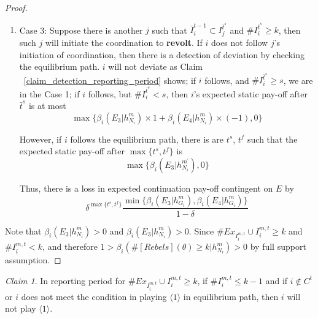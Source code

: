 \documentclass[12pt,letterpaper]{article}
\theoremstyle{definition}
\theoremstyle{remark}
\theoremstyle{claim}
\newtheorem{claim}{Claim}
\begin{document}
\begin{proof}
\begin{enumerate}
\item Case 3: Suppose there is another $j$ such that $\bar{I}^{t-1}_i\subset {I}^{\bar{t}^{s}}_j$ and $\# I^{\bar{t}^s}_i\geq k$, then such $j$ will initiate  the coordination to \textbf{revolt}. If $i$ does not follow $j$'s initiation of coordination, then there is a detection of deviation by checking the equilibrium path. $i$ will not deviate as Claim ~\ref{claim_detection_reporting_period} shows; if $i$ follows, and $\#I^{\bar{t}^s}_i\geq s$, we are in the Case 1; if $i$ follows, but $\#I^{\bar{t}^s}_i< s$, then $i$'s expected static pay-off after $\bar{t}^{s}$ is at most
\[
{\max\{\beta_{i}(E_3|h^{m}_{N_i})\times 1+\beta_{i}(E_4|h^{m}_{N_i})\times (-1), 0\}}
\]

However, if $i$ follows the equilibrium path, there is are $t^s$, $t^f$ such that the expected static pay-off after $\max\{t^s,t^f\}$ is
\[\max\{\beta_{i}(E_3|h^{m^{'}}_{N_i}),0\}\]

Thus, there is a loss in expected continuation pay-off contingent on $E$ by
\[\delta^{\max\{t^s,t^f\}}\frac{\min\{\beta_{i}(E_3|h^{m}_{G_i}),\beta_{i}(E_4|h^{m}_{G_i})\}}{1-\delta}\]
\end{enumerate}

Note that $\beta_{i}(E_3|h^{m}_{N_i})>0$ and $\beta_{i}(E_3|h^{m}_{N_i})>0$. Since $\#Ex_{I^{m,t}_i}\cup I^{m,t}_i\geq k$ and $\# I^{m,t}_i<k$, and therefore $1>\beta_{i}(\#[Rebels](\theta)\geq k|h^{m}_{N_i})>0$ by full support assumption.
\end{proof}



\begin{claim} 
\label{claim_can_not_pretend_almost_success}
In reporting period for $\#Ex_{I^{m,t}_i}\cup I^{m,t}_i\geq k$, if $\#I^{m,t}_i\leq k-1$ and if $i\notin C^t$ or $i$ does not meet the condition in playing $\langle 1 \rangle$ in equilibrium path, then $i$ will not play $\langle 1 \rangle$.
\end{claim}
\end{document}
